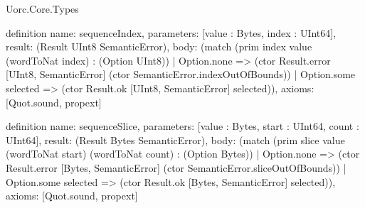 \begin{lexlean}{Uorc.Core.Types}
\begin{semanticmodule}
definition{
  name: sequenceIndex,
  parameters: [value : Bytes, index : UInt64],
  result: (Result UInt8 SemanticError),
  body: (match (prim index value (wordToNat index) : (Option UInt8))
    | Option.none => (ctor Result.error [UInt8, SemanticError] (ctor SemanticError.indexOutOfBounds))
    | Option.some selected => (ctor Result.ok [UInt8, SemanticError] selected)),
  axioms: [Quot.sound, propext]
}

definition{
  name: sequenceSlice,
  parameters: [value : Bytes, start : UInt64, count : UInt64],
  result: (Result Bytes SemanticError),
  body: (match (prim slice value (wordToNat start) (wordToNat count) : (Option Bytes))
    | Option.none => (ctor Result.error [Bytes, SemanticError] (ctor SemanticError.sliceOutOfBounds))
    | Option.some selected => (ctor Result.ok [Bytes, SemanticError] selected)),
  axioms: [Quot.sound, propext]
}


\end{semanticmodule}
\end{lexlean}

